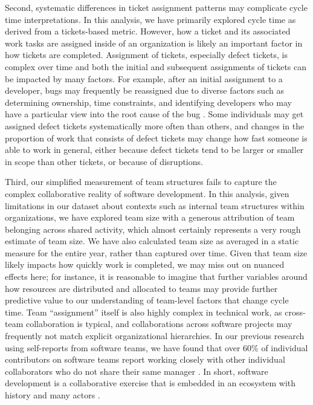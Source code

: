 \documentclass[
  sn-mathphys-ay,
]{sn-jnl}
\begin{document}
Second, systematic differences in ticket assignment patterns may
complicate cycle time interpretations. In this analysis, we have
primarily explored cycle time as derived from a tickets-based metric.
However, how a ticket and its associated work tasks are assigned inside
of an organization is likely an important factor in how tickets are
completed. Assignment of tickets, especially defect tickets, is complex
over time and both the initial and subsequent assignments of tickets can
be impacted by many factors. For example, after an initial assignment to
a developer, bugs may frequently be reassigned due to diverse factors
such as determining ownership, time constraints, and identifying
developers who may have a particular view into the root cause of the bug
\citep{guoNotMyBug2011}. Some individuals may get assigned defect
tickets systematically more often than others, and changes in the
proportion of work that consists of defect tickets may change how fast
someone is able to work in general, either because defect tickets tend
to be larger or smaller in scope than other tickets, or because of
disruptions.

Third, our simplified measurement of team structures fails to capture
the complex collaborative reality of software development. In this
analysis, given limitations in our dataset about contexts such as
internal team structures within organizations, we have explored team
size with a generous attribution of team belonging across shared
activity, which almost certainly represents a very rough estimate of
team size. We have also calculated team size as averaged in a static
measure for the entire year, rather than captured over time. Given that
team size likely impacts how quickly work is completed, we may miss out
on nuanced effects here; for instance, it is reasonable to imagine that
further variables around how resources are distributed and allocated to
teams may provide further predictive value to our understanding of
team-level factors that change cycle time. Team ``assignment'' itself is
also highly complex in technical work, as cross-team collaboration is
typical, and collaborations across software projects may frequently not
match explicit organizational hierarchies. In our previous research
using self-reports from software teams, we have found that over 60\% of
individual contributors on software teams report working closely with
other individual collaborators who do not share their same manager
\citep{hicksDeveloperThrivingFour2023}. In short, software development
is a collaborative exercise that is embedded in an ecosystem with
history and many actors \citep{hicksCumulativeCultureTheory2024}.
\end{document}
